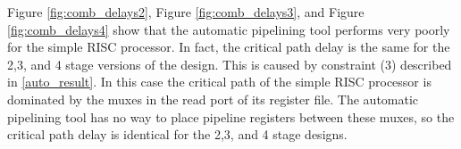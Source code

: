 Figure \ref{fig:comb_delays2}, Figure \ref{fig:comb_delays3}, and Figure \ref{fig:comb_delays4} show that the automatic pipelining tool performs very poorly for the simple RISC processor. In fact, the critical path delay is the same for the 2,3, and 4 stage versions of the design. This is caused by constraint (3) described in \ref{auto_result}. In this case the critical path of the simple RISC processor is dominated by the muxes in the read port of its register file. The automatic pipelining tool has no way to place pipeline registers between these muxes, so the critical path delay is identical for the 2,3, and 4 stage designs.

